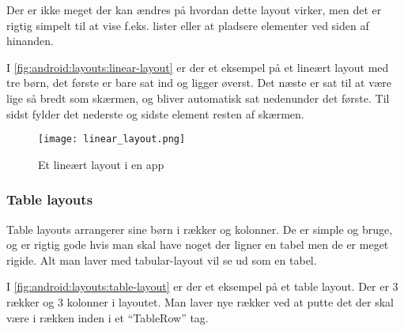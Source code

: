 Der er ikke meget der kan ændres på hvordan dette layout virker, men det er 
rigtig simpelt til at vise f.eks. lister eller at pladsere elementer ved siden 
af hinanden.

I \autoref{fig:android:layouts:linear-layout} er der et eksempel på et lineært 
layout med tre børn, det første er bare sat ind og ligger øverst. Det næste er 
sat til at være lige så bredt som skærmen, og bliver automatisk sat nedenunder 
det første. Til sidst fylder det nederste og sidste element resten af skærmen.

\begin{figure}[h]
	\begin{center}
		\texttt{[image: linear\_layout.png]}
		\caption{Et lineært layout i en app}
		\label{fig:android:layouts:linear-layout}
	\end{center}
\end{figure}


\clearpage

\FloatBarrier
\subsubsection{Table layouts}
Table layouts arrangerer sine børn i rækker og kolonner. De er simple og 
bruge, og er rigtig gode hvis man skal have noget der ligner en tabel men de er 
meget rigide. Alt man laver med tabular-layout vil se ud som en tabel.
 
I \autoref{fig:android:layouts:table-layout} er der et eksempel på et table 
layout. Der er 3 rækker og 3 kolonner i layoutet. Man laver nye rækker ved at 
putte det der skal være i rækken inden i et ``TableRow'' tag.
 
